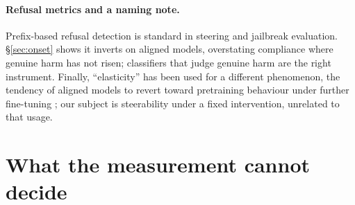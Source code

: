 \documentclass[11pt]{article}
\begin{document}
\paragraph{Refusal metrics and a naming note.} Prefix-based refusal detection is standard in
steering and jailbreak evaluation. \S\ref{sec:onset} shows it inverts on aligned models,
overstating compliance where genuine harm has not risen; classifiers that judge genuine harm
\citep{harmbench} are the right instrument. Finally, ``elasticity'' has been used for a different
phenomenon, the tendency of aligned models to revert toward pretraining behaviour under further
fine-tuning \citep{jielasticity}; our subject is steerability under a fixed intervention, unrelated
to that usage.

\section{What the measurement cannot decide}\label{sec:limits}
\end{document}
